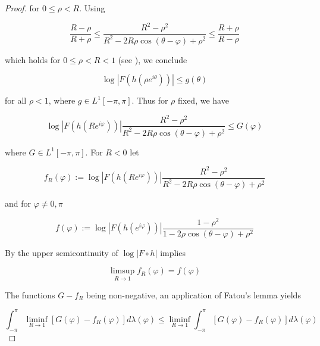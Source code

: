 \begin{proof}
for $0 \leqslant \rho < R$. Using 

\begin{equation*}
	\frac{R - \rho}{R + \rho} \leqslant \frac{R^2 - \rho^2}{R^2 - 2R\rho\cos(\theta - \varphi) + \rho^2} \leqslant \frac{R + \rho}{R - \rho}
\end{equation*}

which holds for $0 \leqslant \rho < R < 1$ (see \cite[236]{rudin:rc_analysis:1987}), we conclude

\begin{equation*}
	\log\left| F(h(\rho e^{i\theta}))\right| \leqslant g(\theta)
\end{equation*}

for all $\rho < 1$, where $g \in L^1[-\pi,\pi]$. Thus for $\rho$ fixed, we have 

\begin{equation*}
	\log\left| F(h(Re^{i\varphi}))\right| \frac{R^2 - \rho^2}{R^2 - 2R\rho\cos(\theta - \varphi) + \rho^2} \leqslant G(\varphi)
\end{equation*}

where $G \in L^1[-\pi,\pi]$. For $R < 0$ let

\begin{equation*}
	f_R(\varphi) := \log\left| F(h(Re^{i\varphi}))\right| \frac{R^2 - \rho^2}{R^2 - 2R\rho\cos(\theta - \varphi) + \rho^2}
\end{equation*}

and for $\varphi \neq 0,\pi$

\begin{equation*}
	f(\varphi) := \log\left| F(h(e^{i\varphi}))\right| \frac{1 - \rho^2}{1 - 2\rho\cos(\theta - \varphi) + \rho^2}
\end{equation*}

By \cite[363]{bourbaki:general_topology:1995} the upper semicontinuity of $\log\left| F \circ h\right|$ implies

\begin{equation*}
	\limsup_{R \to 1}f_R(\varphi) = f(\varphi)
\end{equation*}

The functions $G - f_R$ being non-negative, an application of Fatou's lemma yields

\begin{equation*}
	\int_{-\pi}^\pi \liminf_{R \to 1}\left[ G(\varphi) - f_R(\varphi)\right]d\lambda(\varphi) \leqslant \liminf_{R \to 1} \int_{-\pi}^\pi \left[ G(\varphi) - f_R(\varphi)\right]d\lambda(\varphi)
\end{equation*}


\end{proof}
